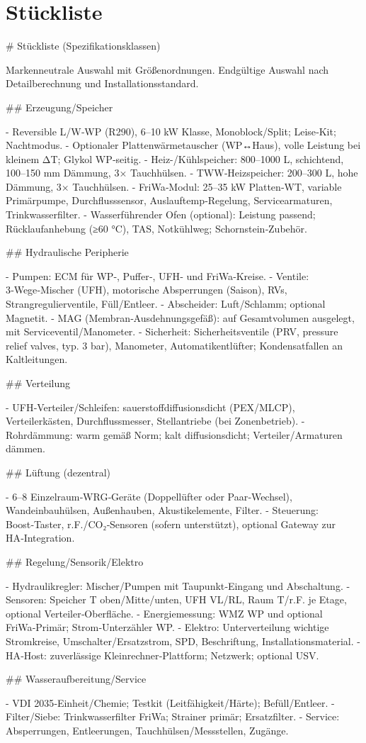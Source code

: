 \documentclass[11pt,oneside]{report}
\begin{document}
\chapter{Stückliste}
\begin{markdown}
# Stückliste (Spezifikationsklassen)

Markenneutrale Auswahl mit Größenordnungen. Endgültige Auswahl nach Detailberechnung und Installationsstandard.

## Erzeugung/Speicher

- Reversible L/W‑WP (R290), 6–10 kW Klasse, Monoblock/Split; Leise‑Kit; Nachtmodus.
- Optionaler Plattenwärmetauscher (WP↔Haus), volle Leistung bei kleinem ΔT; Glykol WP‑seitig.
- Heiz-/Kühlspeicher: 800–1000 L, schichtend, 100–150 mm Dämmung, 3× Tauchhülsen.
- TWW‑Heizspeicher: 200–300 L, hohe Dämmung, 3× Tauchhülsen.
- FriWa‑Modul: 25–35 kW Platten‑WT, variable Primärpumpe, Durchflusssensor, Auslauftemp‑Regelung, Servicearmaturen, Trinkwasserfilter.
- Wasserführender Ofen (optional): Leistung passend; Rücklaufanhebung (≥60 °C), TAS, Notkühlweg; Schornstein‑Zubehör.

## Hydraulische Peripherie

- Pumpen: ECM für WP‑, Puffer‑, UFH‑ und FriWa‑Kreise.
- Ventile: 3‑Wege‑Mischer (UFH), motorische Absperrungen (Saison), RVs, Strangregulierventile, Füll/Entleer.
- Abscheider: Luft/Schlamm; optional Magnetit.
- MAG (Membran‑Ausdehnungsgefäß): auf Gesamtvolumen ausgelegt, mit Serviceventil/Manometer.
- Sicherheit: Sicherheitsventile (PRV, pressure relief valves, typ. 3 bar), Manometer, Automatikentlüfter; Kondensatfallen an Kaltleitungen.

## Verteilung

- UFH‑Verteiler/Schleifen: sauerstoffdiffusionsdicht (PEX/MLCP), Verteilerkästen, Durchflussmesser, Stellantriebe (bei Zonenbetrieb).
- Rohrdämmung: warm gemäß Norm; kalt diffusionsdicht; Verteiler/Armaturen dämmen.

## Lüftung (dezentral)

- 6–8 Einzelraum‑WRG‑Geräte (Doppellüfter oder Paar‑Wechsel), Wandeinbauhülsen, Außenhauben, Akustikelemente, Filter.
- Steuerung: Boost‑Taster, r.F./CO₂‑Sensoren (sofern unterstützt), optional Gateway zur HA‑Integration.

## Regelung/Sensorik/Elektro

- Hydraulikregler: Mischer/Pumpen mit Taupunkt‑Eingang und Abschaltung.
- Sensoren: Speicher T oben/Mitte/unten, UFH VL/RL, Raum T/r.F. je Etage, optional Verteiler‑Oberfläche.
- Energiemessung: WMZ WP und optional FriWa‑Primär; Strom‑Unterzähler WP.
- Elektro: Unterverteilung wichtige Stromkreise, Umschalter/Ersatzstrom, SPD, Beschriftung, Installationsmaterial.
- HA‑Host: zuverlässige Kleinrechner‑Plattform; Netzwerk; optional USV.

## Wasseraufbereitung/Service

- VDI 2035‑Einheit/Chemie; Testkit (Leitfähigkeit/Härte); Befüll/Entleer.
- Filter/Siebe: Trinkwasserfilter FriWa; Strainer primär; Ersatzfilter.
- Service: Absperrungen, Entleerungen, Tauchhülsen/Messstellen, Zugänge.
\end{markdown}
\end{document}
